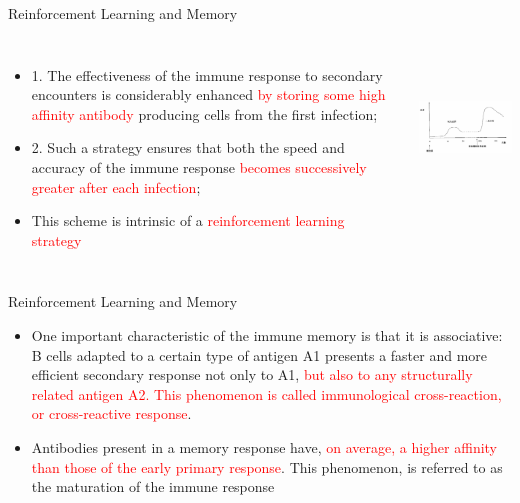 \begin{frame}{Reinforcement Learning and Memory}
\begin{columns}[c] 
\begin{itemize}
\item{1. The effectiveness of the immune response to secondary encounters is considerably enhanced  \textcolor{red}{by storing some high affinity antibody} producing cells from the first infection;}
\item{2. Such a strategy ensures that both the speed and accuracy of the immune response \textcolor{red}{becomes successively greater after each infection};}
\item{This scheme is intrinsic of a \textcolor{red}{reinforcement learning strategy} }
\end{itemize}
\includegraphics[height=4cm]{img/cj_reinfor_learn.png}
\end{columns}
\end{frame}


\begin{frame}{Reinforcement Learning and Memory}
\begin{itemize}
\item{One important characteristic of the immune memory is that it is associative: B cells adapted to a certain type of antigen A1 presents a faster and more efficient secondary response not only to A1, \textcolor{red}{but also to any structurally related antigen A2.  This phenomenon is called immunological cross-reaction, or cross-reactive response}.}
\item{Antibodies present in a memory response have, \textcolor{red}{on average, a higher affinity than those of the early primary response}. This phenomenon, is referred to as the maturation of the immune response}
\end{itemize}
\end{frame}


